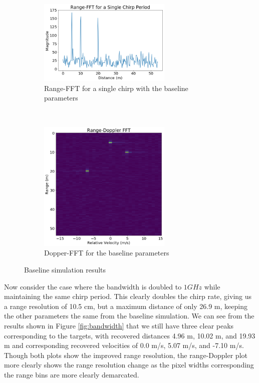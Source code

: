 \begin{figure}[h]
	\centering 
	\begin{subfigure}[c]{0.5\textwidth}
		\centering
		\includegraphics[width=2.5in]{imgs/baseline_range}
		\caption{Range-FFT for a single chirp with the baseline
		parameters}
	\end{subfigure}%
	~
	\begin{subfigure}[c]{0.5\textwidth}
		\centering
		\includegraphics[width=2.5in]{imgs/baseline_doppler}
		\caption{Dopper-FFT for the baseline parameters}
	\end{subfigure}
	\caption{Baseline simulation results}
	\label{fig:baseline}
\end{figure}

Now consider the case where the bandwidth is doubled to $1 GHz$ while
maintaining the same chirp period. This clearly doubles the chirp rate, giving
us a range resolution of 10.5 cm, but a maximum distance of only 26.9 m, keeping
the other parameters the same from the baseline simulation. We can see from the
results shown in Figure \ref{fig:bandwidth} that we still have three clear
peaks corresponding to the targets, with recovered distances 4.96 m, 10.02 m,
and 19.93 m and corresponding recovered velocities of 0.0 m/s, 5.07 m/s, and
-7.10 m/s. Though both plots show the improved range resolution, the
range-Doppler plot more clearly shows the range resolution change as the pixel
widths corresponding the range bins are more clearly demarcated.  

